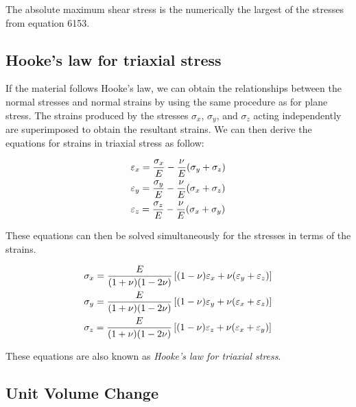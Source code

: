 \documentclass[
10pt,
a4paper,
openany,
svgnames,
]{book} %
\begin{document}
The absolute maximum shear stress is the numerically the largest of the stresses from equation 6153.

\subsection{Hooke’s law for triaxial stress}

If the material follows Hooke’s law, we can obtain the relationships between the normal stresses and normal strains by using the same procedure as for plane stress. The strains produced by the stresses $\sigma_x$, $\sigma_y$, and $\sigma_z$ acting independently are superimposed to obtain the resultant strains. We can then derive the equations for strains in triaxial stress as follow:

\begin{equation}
  \begin{gathered}
    \varepsilon_x = \frac{\sigma_x}{E} - \frac{\nu }{E}(\sigma_y + \sigma_z) \hfill \\
    \varepsilon_y = \frac{\sigma_y}{E} - \frac{\nu }{E}(\sigma_x + \sigma_z) \hfill \\
    \varepsilon_z = \frac{\sigma_z}{E} - \frac{\nu }{E}(\sigma_x + \sigma_y) \hfill 
  \end{gathered}
\end{equation}

These equations can then be solved simultaneously for the stresses in terms of the strains.

\begin{equation}
  \begin{gathered}
    \sigma_x = \frac{E}{(1 + \nu )(1 - 2\nu )}\left[ (1 - \nu )\varepsilon_x + \nu (\varepsilon_y + \varepsilon_z) \right] \hfill \\
    \sigma_y = \frac{E}{(1 + \nu )(1 - 2\nu )}\left[ (1 - \nu )\varepsilon_y + \nu (\varepsilon_x + \varepsilon_z) \right] \hfill \\
    \sigma_z = \frac{E}{(1 + \nu )(1 - 2\nu )}\left[ (1 - \nu )\varepsilon_z + \nu (\varepsilon_x + \varepsilon_y) \right] \hfill \\ 
  \end{gathered}
\end{equation}

These equations are also known as \emph{Hooke’s law for triaxial stress}.

\subsection{Unit Volume Change}
\end{document}
